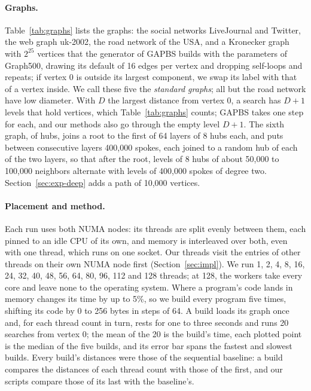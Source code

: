 \paragraph{Graphs.} Table~\ref{tab:graphs} lists the graphs: the social networks LiveJournal and Twitter, the web graph uk-2002, the road network of the USA, and a Kronecker graph with $2^{25}$ vertices that the generator of GAPBS builds with the parameters of Graph500, drawing its default of 16 edges per vertex and dropping self-loops and repeats; if vertex 0 is outside its largest component, we swap its label with that of a vertex inside. We call these five the \emph{standard graphs}; all but the road network have low diameter. With $D$ the largest distance from vertex 0, a search has $D+1$ levels that hold vertices, which Table~\ref{tab:graphs} counts; GAPBS takes one step for each, and our methods also go through the empty level $D+1$. The sixth graph, of hubs, joins a root to the first of 64 layers of 8 hubs each, and puts between consecutive layers 400,000 spokes, each joined to a random hub of each of the two layers, so that after the root, levels of 8 hubs of about 50,000 to 100,000 neighbors alternate with levels of 400,000 spokes of degree two. Section~\ref{sec:exp-deep} adds a path of 10,000 vertices.

\paragraph{Placement and method.} Each run uses both NUMA nodes: its threads are split evenly between them, each pinned to an idle CPU of its own, and memory is interleaved over both, even with one thread, which runs on one socket. Our threads visit the entries of other threads on their own NUMA node first (Section~\ref{sec:impl}). We run 1, 2, 4, 8, 16, 24, 32, 40, 48, 56, 64, 80, 96, 112 and 128 threads; at 128, the workers take every core and leave none to the operating system. Where a program's code lands in memory changes its time by up to 5\%, so we build every program five times, shifting its code by 0 to 256 bytes in steps of 64. A build loads its graph once and, for each thread count in turn, rests for one to three seconds and runs 20 searches from vertex 0; the mean of the 20 is the build's time, each plotted point is the median of the five builds, and its error bar spans the fastest and slowest builds. Every build's distances were those of the sequential baseline: a build compares the distances of each thread count with those of the first, and our scripts compare those of its last with the baseline's.

